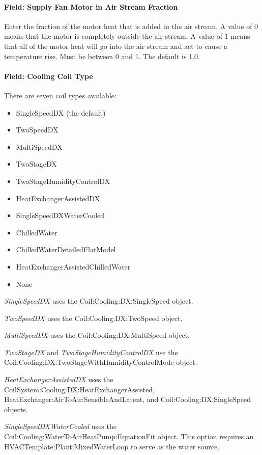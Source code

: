 \paragraph{Field: Supply Fan Motor in Air Stream Fraction}\label{field-supply-fan-motor-in-air-stream-fraction-3}

Enter the fraction of the motor heat that is added to the air stream. A value of 0 means that the motor is completely outside the air stream. A value of 1 means that all of the motor heat will go into the air stream and act to cause a temperature rise. Must be between 0 and 1. The default is 1.0.

\paragraph{Field: Cooling Coil Type}\label{field-cooling-coil-type-7}

There are seven coil types available:

\begin{itemize}
\item
  SingleSpeedDX (the default)
\item
  TwoSpeedDX
\item
  MultiSpeedDX
\item
  TwoStageDX
\item
  TwoStageHumidityControlDX
\item
  HeatExchangerAssistedDX
\item
  SingleSpeedDXWaterCooled
\item
  ChilledWater
\item
  ChilledWaterDetailedFlatModel
\item
  HeatExchangerAssistedChilledWater
\item
  None
\end{itemize}

\emph{SingleSpeedDX} uses the Coil:Cooling:DX:SingleSpeed object.

\emph{TwoSpeedDX} uses the Coil:Cooling:DX:TwoSpeed object.

\emph{MultiSpeedDX} uses the Coil:Cooling:DX:MultiSpeed object.

\emph{TwoStageDX} and \emph{TwoStageHumidityControlDX} use the Coil:Cooling:DX:TwoStageWithHumidityControlMode object.

\emph{HeatExchangerAssistedDX} uses the CoilSystem:Cooling:DX:HeatExchangerAssisted, HeatExchanger:AirToAir:SensibleAndLatent, and Coil:Cooling:DX:SingleSpeed objects.

\emph{SingleSpeedDXWaterCooled} uses the Coil:Cooling:WaterToAirHeatPump:EquationFit object. This option requires an HVACTemplate:Plant:MixedWaterLoop to serve as the water source.

